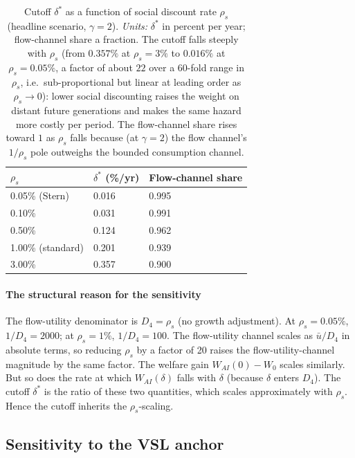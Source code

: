 \documentclass{_latex/house}
\begin{document}
\begin{table}[!ht]
\centering
\begin{tabular}{ll|l}
\toprule
$\rho_s$ & $\delta^*$ (\%/yr) & Flow-channel share \\
\midrule
0.05\% (Stern) & 0.016 & 0.995 \\
0.10\%         & 0.031 & 0.991 \\
0.50\%         & 0.124 & 0.962 \\
1.00\% (standard) & 0.201 & 0.939 \\
3.00\%         & 0.357 & 0.900 \\
\bottomrule
\end{tabular}
\caption{Cutoff $\delta^*$ as a function of social discount rate $\rho_s$ (headline scenario, $\gamma=2$). \emph{Units:} $\delta^*$ in percent per year; flow-channel share a fraction. The cutoff falls steeply with $\rho_s$ (from $0.357\%$ at $\rho_s=3\%$ to $0.016\%$ at $\rho_s=0.05\%$, a factor of about $22$ over a $60$-fold range in $\rho_s$, i.e.\ sub-proportional but linear at leading order as $\rho_s\to0$): lower social discounting raises the weight on distant future generations and makes the same hazard more costly per period. The flow-channel share rises toward $1$ as $\rho_s$ falls because (at $\gamma=2$) the flow channel's $1/\rho_s$ pole outweighs the bounded consumption channel.}
\label{tab:discount}
\end{table}

\paragraph{The structural reason for the sensitivity} The flow-utility denominator is $D_4 = \rho_s$ (no growth adjustment). At $\rho_s = 0.05\%$, $1/D_4 = 2000$; at $\rho_s = 1\%$, $1/D_4 = 100$. The flow-utility channel scales as $\bar u/D_4$ in absolute terms, so reducing $\rho_s$ by a factor of 20 raises the flow-utility-channel magnitude by the same factor. The welfare gain $W_{AI}(0) - W_0$ scales similarly. But so does the rate at which $W_{AI}(\delta)$ falls with $\delta$ (because $\delta$ enters $D_4$). The cutoff $\delta^*$ is the ratio of these two quantities, which scales approximately with $\rho_s$. Hence the cutoff inherits the $\rho_s$-scaling.

\subsection{Sensitivity to the VSL anchor}
\end{document}
